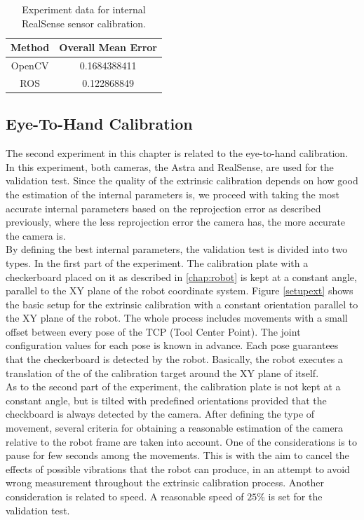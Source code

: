 \begin{table}[ht]
\renewcommand{\arraystretch}{1.3}
\caption{Experiment data for internal RealSense sensor calibration.}
\label{real1}
\centering
\begin{tabular}{|c||c|}
\hline
Method & Overall Mean Error\\
\hline
OpenCV &  0.1684388411\\
\hline
ROS &  0.122868849\\
\hline
\hline
\end{tabular}
\end{table}

\subsection{Eye-To-Hand Calibration}

The second experiment in this chapter is related to the eye-to-hand calibration. In this experiment, both cameras, the Astra and RealSense, are used for the validation test. Since the quality of the extrinsic calibration depends on how good the estimation of the internal parameters is, we proceed with taking the most accurate internal parameters based on the reprojection error as described previously, where the less reprojection error the camera has, the more accurate the camera is. \\
By defining the best internal parameters, the validation test is divided into two types. In the first part of the experiment. The calibration plate with a checkerboard placed on it as described in \ref{chap:robot} is kept at a constant angle, parallel to the XY plane of the robot coordinate system. Figure \ref{setupext} shows the basic setup for the extrinsic calibration with a constant orientation parallel to the XY plane of the robot. The whole process includes movements with a small offset between every pose of the TCP (Tool Center Point). The joint configuration values for each pose is known in advance. Each pose guarantees that the checkerboard is detected by the robot. Basically, the robot executes a translation of the of the calibration target around the XY plane of itself.\\ 

As to the second part of the experiment, the calibration plate is not kept at  a constant angle, but is tilted with predefined orientations provided that the checkboard is always detected by the camera. After defining the type of movement, several criteria for obtaining a reasonable estimation of the camera relative to the robot frame are taken into account. One of the considerations is to pause for few seconds among the movements. This is with the aim to cancel the effects of possible vibrations that the robot can produce, in an attempt to avoid wrong measurement throughout the extrinsic calibration process. Another consideration is related to speed. A reasonable speed of $25\%$ is set for the validation test. \\

